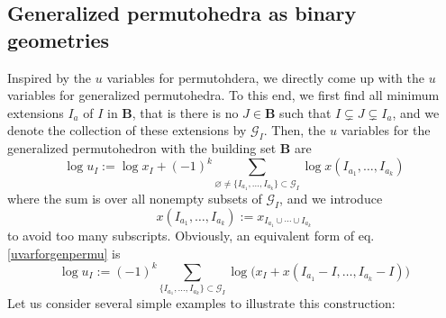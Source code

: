 \documentclass[hidelinks,12pt]{article}
\newcommand{\bea}[1]{\begin{eqnarray}\label{#1} }
\newcommand{\eea}{\end{eqnarray}}
\def\bea{\begin{eqnarray}}
\def\eea{\end{eqnarray}}
\begin{document}

\subsection{Generalized permutohedra as binary geometries}\label{sect3.4}

Inspired by the $u$ variables for permutohdera, we directly come up with the $u$ variables for generalized permutohedra. To this end, we first find all minimum extensions $I_{a}$ of $I$ in $\mathbf{B}$, that is there is no $J\in\mathbf{B}$ such that $I\subsetneq J\subsetneq I_{a}$, and we denote the collection of these extensions by $\mathscr{G}_{I}$. Then, the $u$ variables for the generalized permutohedron with the building set $\mathbf{B}$ are
\begin{equation}
   \log u_{I} :=  \log x_{I} +(-1)^{k}\sum _{\varnothing\neq\{I_{a_{1}},\dots,I_{a_{k}}\}\subset \mathscr{G}_{I}} \log x(I_{a_{1}},\ldots, I_{a_{k}})  \label{uvarforgenpermu}
\end{equation}
where the sum is over all nonempty subsets of $\mathscr{G}_{I}$, and we introduce
\[
x(I_{a_{1}},\ldots,I_{a_{k}}):=x_{I_{a_{1}}\cup \cdots \cup I_{a_{k}}}   
\]
to avoid too many subscripts. Obviously, an equivalent form of eq.\eqref{uvarforgenpermu} is
\begin{equation}
   \log u_{I} := (-1)^{k}\sum _{\{I_{a_{1}},\dots,I_{a_{k}}\}\subset \mathscr{G}_{I}} \log \bigl(x_{I}+x(I_{a_{1}}-I,\ldots, I_{a_{k}}-I)\bigr)  \label{uvarforgenpermu1}
\end{equation}
Let us consider several simple examples to illustrate this construction:
\end{document}
